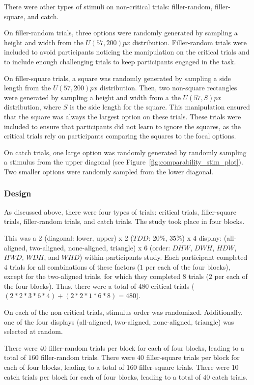 There were other types of stimuli on non-critical trials: filler-random, filler-square, and catch.

On filler-random trials, three options were randomly generated by sampling a height and width from the $U(57,200)px$ distribution. Filler-random trials were included to avoid participants noticing the manipulation on the critical trials and to include enough challenging trials to keep participants engaged in the task.

On filler-square trials, a square was randomly generated by sampling a side length from the $U(57,200)px$ distribution. Then, two non-square rectangles were generated by sampling a height and width from a the $U(57,S)px$ distribution, where $S$ is the side length for the square. This manipulation ensured that the square was always the largest option on these trials. These trials were included to ensure that participants did not learn to ignore the squares, as the critical trials rely on participants comparing the squares to the focal options. 

On catch trials, one large option was randomly generated by randomly sampling a stimulus from the upper diagonal (see Figure~\ref{fig:comparability_stim_plot}). Two smaller options were randomly sampled from the lower diagonal. 

\subsubsection{Design}
As discussed above, there were four types of trials: critical trials, filler-square trials, filler-random trials, and catch trials. The study took place in four blocks.

This was a $2$ (diagonal: lower, upper) x $2$ ($TDD$: $20\%$, $35\%$) x $4$ display: (all-aligned, two-aligned, none-aligned, triangle) x $6$ (order: $DHW$, $DWH$, $HDW$, $HWD$, $WDH$, and $WHD$) within-participants study. Each participant completed $4$ trials for all combinations of these factors ($1$ per each of the four blocks), except for the two-aligned trials, for which they completed $8$ trials ($2$ per each of the four blocks). Thus, there were a total of $480$ critical trials ($(2*2*3*6*4)+ (2*2*1*6*8)=480$).

On each of the non-critical trials, stimulus order was randomized. Additionally, one of the four displays (all-aligned, two-aligned, none-aligned, triangle) was selected at random.

There were $40$ filler-random trials per block for each of four blocks, leading to a total of $160$ filler-random trials. There were $40$ filler-square trials per block for each of four blocks, leading to a total of $160$ filler-square trials. There were $10$ catch trials per block for each of four blocks, leading to a total of $40$ catch trials.

